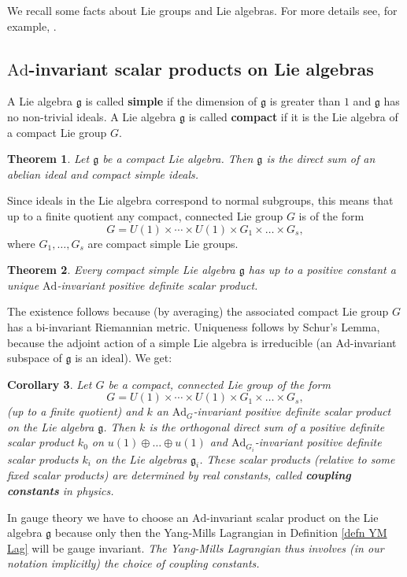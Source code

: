 \documentclass[11pt]{amsart}
\newtheorem{thm}{Theorem}[section]
\newtheorem{cor}[thm]{Corollary}
\theoremstyle{definition}
\theoremstyle{remark}
\numberwithin{equation}{section}
\begin{document}
We recall some facts about Lie groups and Lie algebras. For more details see, for example, \cite{Ziller}.

\subsection{$\mathrm{Ad}$-invariant scalar products on Lie algebras}

A Lie algebra $\mathfrak{g}$ is called {\bf simple} if the dimension of $\mathfrak{g}$ is greater than $1$ and $\mathfrak{g}$ has no non-trivial ideals. A Lie algebra $\mathfrak{g}$ is called {\bf compact} if it is the Lie algebra of a compact Lie group $G$.

\begin{thm} Let $\mathfrak{g}$ be a compact Lie algebra. Then $\mathfrak{g}$ is the direct sum of an abelian ideal and compact simple ideals.
\end{thm}
Since ideals in the Lie algebra correspond to normal subgroups, this means that up to a finite quotient any compact, connected Lie group $G$ is of the form
\begin{equation*}
G=U(1)\times\cdots\times U(1)\times G_1\times\ldots\times G_s,
\end{equation*}
where $G_1,\ldots,G_s$ are compact simple Lie groups.
\begin{thm} Every compact simple Lie algebra $\mathfrak{g}$ has up to a positive constant a unique $\mathrm{Ad}$-invariant positive definite scalar product. 
\end{thm}
The existence follows because (by averaging) the associated compact Lie group $G$ has a bi-invariant Riemannian metric. Uniqueness follows by Schur's Lemma, because the adjoint action of a simple Lie algebra is irreducible (an $\mathrm{Ad}$-invariant subspace of $\mathfrak{g}$ is an ideal). We get:
\begin{cor}
Let $G$ be a compact, connected Lie group of the form
\begin{equation*}
G=U(1)\times\cdots\times U(1)\times G_1\times\ldots\times G_s,
\end{equation*}
(up to a finite quotient) and $k$ an $\mathrm{Ad}_G$-invariant positive definite scalar product on the Lie algebra $\mathfrak{g}$. Then $k$ is the orthogonal direct sum of a positive definite scalar product $k_0$ on $u(1)\oplus\ldots\oplus u(1)$ and $\mathrm{Ad}_{G_i}$-invariant positive definite scalar products $k_i$ on the Lie algebras $\mathfrak{g}_i$. These scalar products (relative to some fixed scalar products) are determined by real constants, called {\bf coupling constants} in physics.
\end{cor}
In gauge theory we have to choose an $\mathrm{Ad}$-invariant scalar product on the Lie algebra $\mathfrak{g}$ because only then the Yang-Mills Lagrangian in Definition \ref{defn YM Lag} will be gauge invariant. {\em The Yang-Mills Lagrangian thus involves (in our notation implicitly) the choice of coupling constants.}
\end{document}

